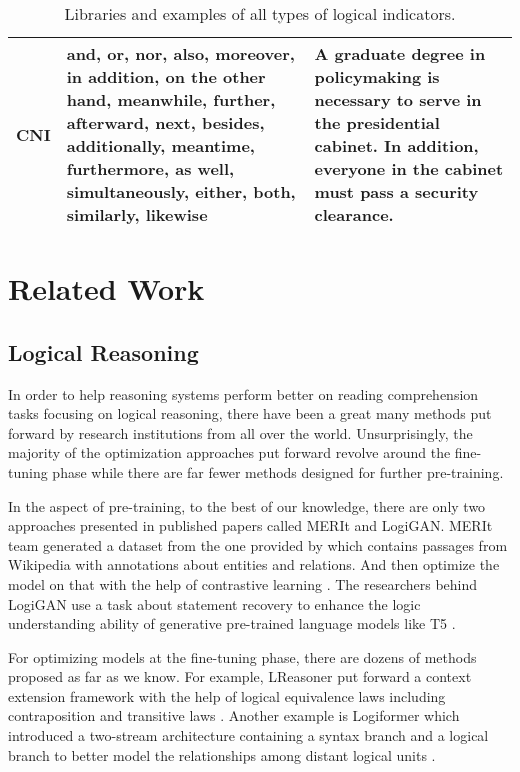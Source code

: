 \documentclass[11pt]{article}
\begin{document}
\begin{table*}
\begin{tabular}{m{0.6cm}<{\centering}p{8cm}p{6cm}}
\textbf{CNI} & and, or, nor, also, moreover, in addition, on the other hand, meanwhile, further, afterward, next, besides, additionally, meantime, furthermore, as well, simultaneously, either, both, similarly, likewise & A graduate degree in policymaking is necessary to serve in the presidential cabinet. \colorbox{coordinatingcolor}{In addition}, everyone in the cabinet must pass a security clearance. \\ 

\bottomrule[1pt]
\end{tabular}
\caption{Libraries and examples of all types of logical indicators.}
\label{table:lgidclibandexp}
\end{table*}




                        
\section{Related Work}

\subsection{Logical Reasoning}
In order to help reasoning systems perform better on reading comprehension tasks focusing on logical reasoning, there have been a great many methods put forward by research institutions from all over the world. Unsurprisingly, the majority of the optimization approaches put forward revolve around the fine-tuning phase while there are far fewer methods designed for further pre-training. 

In the aspect of pre-training, to the best of our knowledge, there are only two approaches presented in published papers called MERIt and LogiGAN. MERIt team generated a dataset from the one provided by \citet{meritdataorigin} which contains passages from Wikipedia with annotations about entities and relations. And then optimize the model on that with the help of contrastive learning \cite{jiao-etal-2022-merit}. The researchers behind LogiGAN use a task about statement recovery to enhance the logic understanding ability of generative pre-trained language models like T5 \cite{logigan}.

For optimizing models at the fine-tuning phase, there are dozens of methods proposed as far as we know. For example, LReasoner put forward a context extension framework with the help of logical equivalence laws including contraposition and transitive laws \cite{lreasoner}. Another example is Logiformer which introduced a two-stream architecture containing a syntax branch and a logical branch to better model the relationships among distant logical units \cite{logiformer}.
\end{document}
